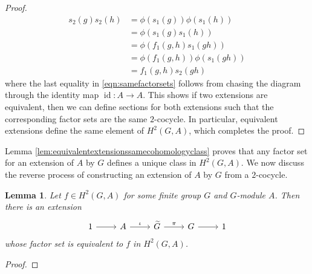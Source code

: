 \documentclass{dcthesis}
\newcommand{\mm}[1]{{\color{blue} \sf MM: [#1]}}
\newcommand{\wt}[1]{\widetilde{#1}}
\DeclareMathOperator{\id}{id}
\numberwithin{equation}{section}
\newtheorem{lemma}[equation]{Lemma}
\theoremstyle{definition}
\theoremstyle{remark}
\begin{document}
{{{\begin{proof}
\begin{equation}
        \label{eqn:samefactorsets}
        \begin{split}
          s_2(g)s_2(h)
          &=\phi(s_1(g))\phi(s_1(h))\\
          &=\phi(s_1(g)s_1(h))\\
          &=\phi(f_1(g,h)s_1(gh))\\
          &=\phi(f_1(g,h))\phi(s_1(gh))\\
          &=f_1(g,h)s_2(gh)
        \end{split}
      \end{equation}
      where the last equality in
      \eqref{eqn:samefactorsets}
      follows from chasing the diagram through the
      identity map $\id\colon A\to A$.
      This shows if two extensions are equivalent,
      then we can define sections for both extensions
      such that the corresponding factor sets
      are the same $2$-cocycle.
      In particular,
      equivalent extensions define the same
      element of $H^2(G,A)$,
      which completes the proof.
    \end{proof}
    Lemma
    \ref{lem:equivalentextensionssamecohomologyclass}
    proves that any factor set for an
    extension of $A$ by $G$
    defines a unique class in
    $H^2(G,A)$.
    We now discuss the reverse process
    of constructing an extension of $A$ by $G$
    from a $2$-cocycle.
    \begin{lemma}
      \label{lem:constructextensionfromcocycle}
      Let $f\in H^2(G,A)$ for some finite group $G$
      and $G$-module $A$.
      Then there is an extension
      \begin{equation}
        \label{eqn:extensionfromcocycle}
        \begin{tikzcd}
          1\arrow{r}&A\arrow{r}{\iota}&\wt{G}\arrow{r}{\pi}
                    &G\arrow{r}&1
        \end{tikzcd}
      \end{equation}
      whose factor set is equivalent to $f$ in $H^2(G,A)$.
    \end{lemma}
    \begin{proof}

\end{proof}}}}
\end{document}
